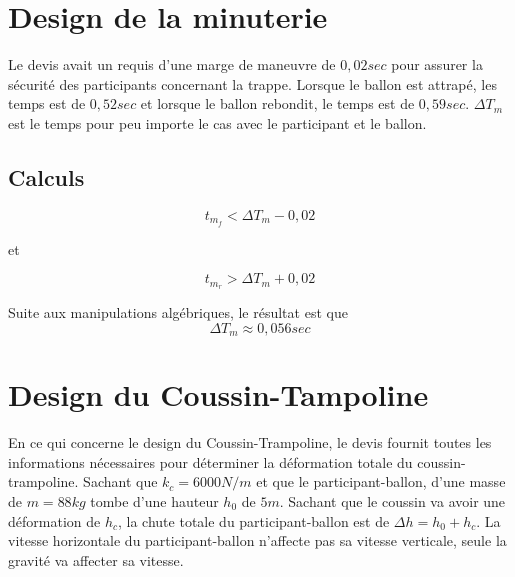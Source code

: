 \documentclass[12pt]{article}
\begin{document}
\section{Design de la minuterie}
Le devis avait un requis d'une marge de maneuvre de $0,02sec$ pour assurer la sécurité des participants concernant la trappe. Lorsque le ballon est attrapé, les temps est de $0,52sec$ et lorsque le ballon rebondit, le temps est de $0,59sec$. $\Delta T_m$ est le temps pour peu importe le cas avec le participant et le ballon.
\subsection{Calculs}
\begin{equation}
t_{m_f} < \Delta T_m - 0,02
\end{equation}
\begin{center}
et
\end{center}
\begin{equation}
t_{m_r} > \Delta T_m + 0,02
\end{equation}

Suite aux manipulations algébriques, le résultat est que 
\begin{equation}
\Delta T_m \approx 0,056 sec
\end{equation}

\section{Design du Coussin-Tampoline}
En ce qui concerne le design du Coussin-Trampoline, le devis fournit toutes les informations nécessaires pour déterminer la déformation totale du coussin-trampoline. Sachant que $k_c = 6000N/m$ et que le participant-ballon, d'une masse de $m = 88kg$ tombe d'une hauteur $h_0$ de $5 m$. Sachant que le coussin va avoir une déformation de $h_c$, la chute totale du participant-ballon est de $\Delta h = h_0 + h_c$. La vitesse horizontale du participant-ballon n'affecte pas sa vitesse verticale, seule la gravité va affecter sa vitesse.
\end{document}
